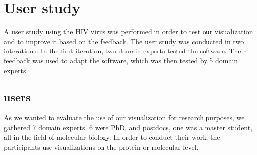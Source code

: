 \documentclass[review,journal]{vgtc}         %
\begin{document}
%
%

\section{User study}
A user study using the HIV virus was performed in order to test our visualization and to improve it based on the feedback.
The user study was conducted in two interations. 
In the first iteration, two domain experts tested the software. 
Their feedback was used to adapt the software, which was then tested by 5 domain experts.

\subsection{users}
As we wanted to evaluate the use of our visualization for research purposes, we gathered 7 domain experts. 6 were PhD. and postdocs, one was a master student, all in the field of molecular biology. In order to conduct their work, the participants use visualizations on the protein or molecular level.
\end{document}
